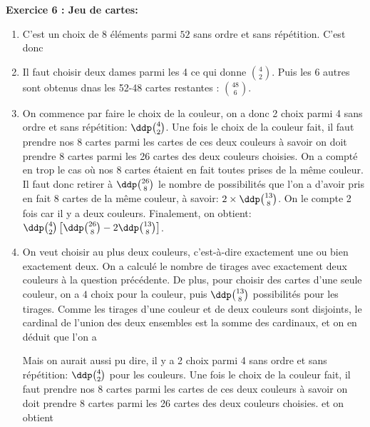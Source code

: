 \documentclass[a4paper, 11pt,reqno]{article}
\begin{document}
\begin{correction}  \; \textbf{Exercice 6 : Jeu de cartes:}
\begin{enumerate}
\item C'est un choix de $8$ éléments parmi $52$ sans ordre et sans répétition. C'est donc 
\item Il faut choisir deux dames parmi les 4 ce qui donne $\binom{4}{2} $. Puis les 6 autres sont obtenus dnas les 52-48 cartes restantes : $\binom{48}{6}$.


\item On commence par faire le choix de la couleur, on a donc 2 choix parmi 4 sans ordre et sans r\'ep\'etition: $\ddp \binom{4}{2}$. Une fois le choix de la couleur fait, il faut prendre nos 8 cartes parmi les cartes de ces deux couleurs \`a savoir on doit prendre 8 cartes parmi les 26 cartes des deux couleurs choisies. On a compt\'e en trop le cas o\`u nos 8 cartes \'etaient en fait toutes prises de la m\^eme couleur. Il faut donc retirer \`a $\ddp \binom{26}{8}$ le nombre de possibilit\'es que l'on a d'avoir pris en fait 8 cartes de la m\^eme couleur, \`a savoir: $2\times\ddp \binom{13}{8}$. On le compte 2 fois car il y a deux couleurs. Finalement, on obtient: $\ddp \binom{4}{2}\left\lbrack \ddp \binom{26}{8}-2\ddp \binom{13}{8}   \right\rbrack$.
\item On veut choisir au plus deux couleurs, c'est-\`a-dire exactement une ou bien exactement deux. On a calcul\'e le nombre de tirages avec exactement deux couleurs \`a la question pr\'ec\'edente. De plus, pour choisir des cartes d'une seule couleur, on a $4$ choix pour la couleur, puis $\ddp \binom{13}{8}$ possibilit\'es pour les tirages. Comme les tirages d'une couleur et de deux couleurs sont disjoints, le cardinal de l'union des deux ensembles est la somme des cardinaux, et on en d\'eduit que l'on a


Mais on aurait aussi pu dire, il y a 2 choix parmi 4 sans ordre et sans r\'ep\'etition: $\ddp \binom{4}{2}$ pour les couleurs. Une fois le choix de la couleur fait, il faut prendre nos 8 cartes parmi les cartes de ces deux couleurs \`a savoir on doit prendre 8 cartes parmi les 26 cartes des deux couleurs choisies. 
et on obtient 

\end{enumerate}
\end{correction}
\end{document}
